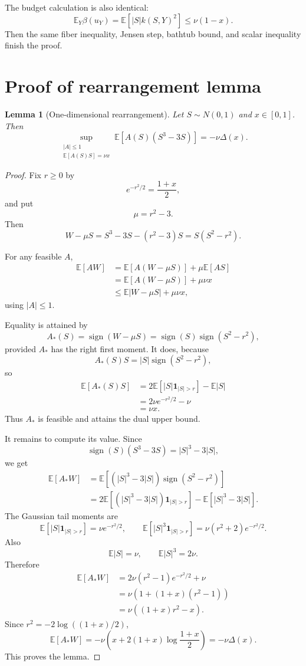 \documentclass[11pt]{article}
\newtheorem{lemma}[theorem]{Lemma}
\newcommand{\E}{\mathbb E}
\newcommand{\one}{\mathbf 1}
\newcommand{\sgn}{\operatorname{sign}}
\begin{document}
The budget calculation is also identical:
\[
        \E_Y\beta(u_Y)=\E[|S|k(S,Y)^2]\le \nu(1-x).
\]
Then the same fiber inequality, Jensen step, bathtub bound, and scalar inequality finish the proof.

\appendix 

\section{Proof of rearrangement lemma}
\label{app:rearrangement_lemma}


\begin{lemma}[One-dimensional rearrangement]
Let $S\sim N(0,1)$ and $x\in[0,1]$.  Then
\[
        \sup_{\substack{|A|\le1\\ \E[A(S)S]=\nu x}}
        \E[A(S)(S^3-3S)]
        =-\nu\Delta(x).
\]
\end{lemma}

\begin{proof}
Fix $r\ge0$ by
\[
        e^{-r^2/2}=\frac{1+x}{2},
\]
and put
\[
        \mu=r^2-3.
\]
Then
\[
        W-\mu S=S^3-3S-(r^2-3)S=S(S^2-r^2).
\]

For any feasible $A$,
\begin{align*}
        \E[AW]
        &=\E[A(W-\mu S)]+\mu\E[AS]\\
        &=\E[A(W-\mu S)]+\mu\nu x\\
        &\le \E|W-\mu S|+\mu\nu x,
\end{align*}
using $|A|\le1$.

Equality is attained by
\[
        A_*(S)=\sgn(W-\mu S)=\sgn(S)\sgn(S^2-r^2),
\]
provided $A_*$ has the right first moment.  It does, because
\[
        A_*(S)S=|S|\sgn(S^2-r^2),
\]
so
\begin{align*}
        \E[A_*(S)S]
        &=2\E[|S|\one_{|S|>r}]-\E|S|\\
        &=2\nu e^{-r^2/2}-\nu\\
        &=\nu x.
\end{align*}
Thus $A_*$ is feasible and attains the dual upper bound.

It remains to compute its value.  Since
\[
        \sgn(S)(S^3-3S)=|S|^3-3|S|,
\]
we get
\begin{align*}
        \E[A_*W]
        &=\E[(|S|^3-3|S|)\sgn(S^2-r^2)]\\
        &=2\E[(|S|^3-3|S|)\one_{|S|>r}]
          -\E[|S|^3-3|S|].
\end{align*}
The Gaussian tail moments are
\[
        \E[|S|\one_{|S|>r}]=\nu e^{-r^2/2},
        \qquad
        \E[|S|^3\one_{|S|>r}]=\nu(r^2+2)e^{-r^2/2}.
\]
Also
\[
        \E|S|=\nu,
        \qquad
        \E|S|^3=2\nu.
\]
Therefore
\begin{align*}
        \E[A_*W]
        &=2\nu(r^2-1)e^{-r^2/2}+\nu\\
        &=\nu\left(1+(1+x)(r^2-1)\right)\\
        &=\nu\left((1+x)r^2-x\right).
\end{align*}
Since $r^2=-2\log((1+x)/2)$,
\[
        \E[A_*W]
        =-\nu\left(x+2(1+x)\log\frac{1+x}{2}\right)
        =-\nu\Delta(x).
\]
This proves the lemma.
\end{proof}



\end{document}
